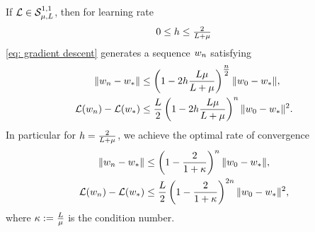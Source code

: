 \begin{theorem}
	\label{thm: gd strong convexity convergence rate}
	If \(\mathcal{L}\in\mathcal{S}^{1,1}_{{\mu},{L}}\), then for learning rate
	\[0 \le h \le \tfrac{2}{L+\mu}\]
	\ref{eq: gradient descent} generates a sequence \(w_n\) satisfying
	\begin{subequations}
	\begin{align}
		\label{eq: gd strong convexity convergence rate 1}
		\|w_n - w_*\|
		&\le \left(
			1- 2h\frac{L\mu}{L+\mu}
		\right)^{\tfrac{n}2}
		\|w_0 - w_*\|, \\
		\label{eq: gd strong convexity convergence rate 2}
		\mathcal{L}(w_n) - \mathcal{L}(w_*)
		&\le \frac{L}{2} \left(
			1- 2h\frac{L\mu}{L+\mu}
		\right)^{n}
		\|w_0 - w_*\|^2.
	\end{align}
	\end{subequations}
	In particular for \(h=\tfrac2{L+\mu}\), we achieve the optimal
	rate of convergence
	\begin{subequations}\label{eq: gd strong convexity optimal rate}
	\begin{align}
		\|w_n - w_*\|
		&\le \left(
			1- \frac{2}{1+\kappa}
		\right)^n
		\|w_0 - w_*\|, \\
		\mathcal{L}(w_n) - \mathcal{L}(w_*)
		&\le \frac{L}{2} \left(
			1- \frac{2}{1+\kappa}
		\right)^{2n}
		\|w_0 - w_*\|^2,
	\end{align}
	\end{subequations}
	where \(\kappa:=\tfrac{L}{\mu}\) is the condition number.
\end{theorem}
